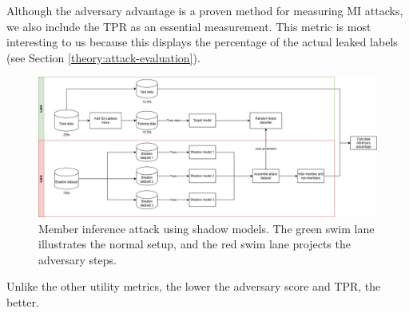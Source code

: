 \begin{enumerate}
        Although the adversary advantage is a proven method for measuring MI attacks, we also include the TPR as an essential measurement.
        This metric is most interesting to us because this displays the percentage of the actual leaked labels (see Section \ref{theory:attack-evaluation}).
        \begin{figure}[H]
          \includegraphics[width=1\textwidth]{Method/images/MI-setup.png}
          \caption{Member inference attack using shadow models. The green swim lane illustrates the normal setup, and the red swim lane projects the adversary steps.}
          \label{figure:mi-attack}
        \end{figure}
        Unlike the other utility metrics, the lower the adversary score and TPR, the better.
\end{enumerate}
\newpage
%

